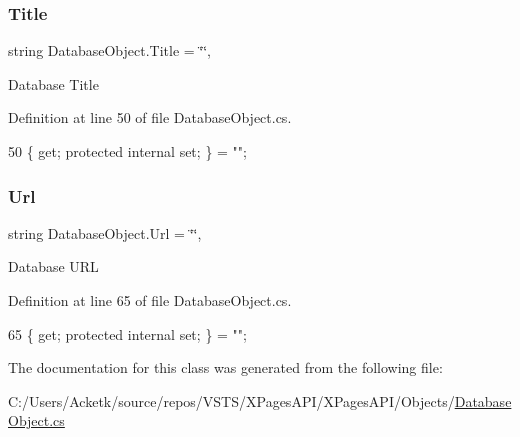 \subsubsection{\texorpdfstring{Title}{Title}}
{\footnotesize\ttfamily string Database\+Object.\+Title = \char`\"{}\char`\"{}\hspace{0.3cm}{\ttfamily [get]}, {\ttfamily [set]}}



Database Title 



Definition at line 50 of file Database\+Object.\+cs.


\begin{DoxyCode}
50 \{ \textcolor{keyword}{get}; \textcolor{keyword}{protected} \textcolor{keyword}{internal} \textcolor{keyword}{set}; \} = \textcolor{stringliteral}{""};
\end{DoxyCode}
\mbox{\label{class_database_object_a12da011e3dc03d3a10ac86df10c84f48}} 
\subsubsection{\texorpdfstring{Url}{Url}}
{\footnotesize\ttfamily string Database\+Object.\+Url = \char`\"{}\char`\"{}\hspace{0.3cm}{\ttfamily [get]}, {\ttfamily [set]}}



Database U\+RL 



Definition at line 65 of file Database\+Object.\+cs.


\begin{DoxyCode}
65 \{ \textcolor{keyword}{get}; \textcolor{keyword}{protected} \textcolor{keyword}{internal} \textcolor{keyword}{set}; \} = \textcolor{stringliteral}{""};
\end{DoxyCode}


The documentation for this class was generated from the following file\+:\begin{DoxyCompactItemize}
\item 
C\+:/\+Users/\+Acketk/source/repos/\+V\+S\+T\+S/\+X\+Pages\+A\+P\+I/\+X\+Pages\+A\+P\+I/\+Objects/\mbox{\hyperlink{_database_object_8cs}{Database\+Object.\+cs}}\end{DoxyCompactItemize}

